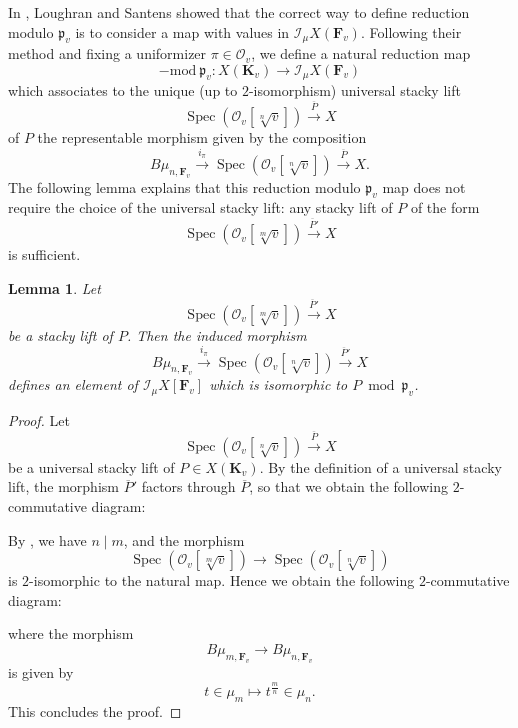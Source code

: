 \documentclass{proc-l}
\newcommand{\K}{\mathbf{K}}
\newcommand{\F}{\mathbf{F}}
\newcommand{\I}{\mathcal{I}}
\DeclareMathOperator{\Spec}{Spec}
\newcommand{\sheafI}{\mathcal{I}}
\newcommand{\sheafO}{\mathcal{O}}
\newtheorem{lemma}[theorem]{Lemma}
\theoremstyle{definition}
\theoremstyle{remark}
\numberwithin{equation}{section}
\begin{document}
In \cite[Paragraph 4.4]{loughran_santens_malle_conjecture}, Loughran and Santens showed that the correct way to define reduction modulo $\mathfrak{p}_v$ is to consider a map with values in $\sheafI_{\mu} X (\F_v)$. Following their method and fixing a uniformizer $\pi \in \sheafO_v$, we define a natural reduction map
$$
- \text{mod} \ \mathfrak{p}_v : X(\K_v) \rightarrow \sheafI_{\mu} X(\F_v)
$$
which associates to the unique (up to $2$-isomorphism) universal stacky lift
$$
\Spec(\sheafO_v[\sqrt[n]{v}]) \xrightarrow{\overline P} X
$$
of $P$ the representable morphism given by the composition
$$
B \mu_{n,\F_v} \xrightarrow{i_\pi} \Spec(\sheafO_v[\sqrt[n]{v}]) \xrightarrow{\overline P} X .
$$The following lemma explains that this reduction modulo $\mathfrak{p}_v$ map does not require the choice of the universal stacky lift: any stacky lift of $P$ of the form
$$
\Spec(\sheafO_v[\sqrt[m]{v}]) \xrightarrow{\overline P'} X
$$
is sufficient.

\begin{lemma}\label{lemma_reduction_map_choice_stacky_lift}
Let
$$
\Spec(\sheafO_v[\sqrt[m]{v}]) \xrightarrow{\overline P'} X
$$
be a stacky lift of $P$. Then the induced morphism
$$
B \mu_{n,\F_v}
\xrightarrow{i_{\pi}}
\Spec(\sheafO_v[\sqrt[n]{v}])
\xrightarrow{\overline P'}
X
$$
defines an element of $\I_{\mu}X[\F_v]$ which is isomorphic to $P \bmod \mathfrak{p}_v$.
\end{lemma}

\begin{proof}
Let
$$
\Spec(\sheafO_v[\sqrt[n]{v}]) \xrightarrow{\overline P} X
$$
be a universal stacky lift of $P \in X(\K_v)$. By the definition of a universal stacky lift, the morphism $\overline P'$ factors through $\overline P$, so that we obtain the following $2$-commutative diagram:
\begin{center}
\end{center}

By \cite[Lemma~3.6]{2023_Bresciani}, we have $n \mid m$, and the morphism
$$
\Spec(\sheafO_v[\sqrt[m]{v}]) \longrightarrow \Spec(\sheafO_v[\sqrt[n]{v}])
$$
is $2$-isomorphic to the natural map. Hence we obtain the following $2$-commutative diagram:
\begin{center}
\end{center}
where the morphism
$$
B\mu_{m,\F_v} \longrightarrow B\mu_{n,\F_v}
$$
is given by
$$
t \in \mu_m \longmapsto t^{\frac{m}{n}} \in \mu_n .
$$
This concludes the proof.
\end{proof}
\end{document}
